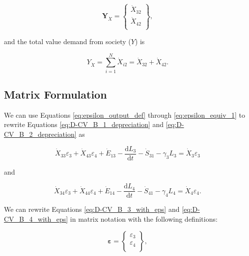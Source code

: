 \documentclass[authoryear,preprint,review,12pt]{elsarticle}
\renewcommand{\vec}[1]{\mathbf{#1}}
\begin{document}
\begin{equation} \label{eq:D-demand_vector_B_dot}
	\vec{Y}_{\dot{X}} = 	\begin{Bmatrix} 	\dot{X}_{32}	\\
																\dot{X}_{42}	\\
									\end{Bmatrix},
\end{equation}

\noindent and the total value demand from society ($Y$) is 

\begin{equation} \label{eq:D-total_value_demand}
	Y_{\dot{X}} = \sum_{i=1}^{N} \dot{X}_{i2} = \dot{X}_{32} + \dot{X}_{42}.
	\end{equation}

\subsection{Matrix Formulation}

We can use Equations \ref{eq:epsilon_output_def} through \ref{eq:epsilon_equiv_1} to rewrite Equations \ref{eq:D-CV_B_1_depreciation} and \ref{eq:D-CV_B_2_depreciation} as

\begin{equation} \label{eq:D-CV_B_3_with_eps}
	\dot{X}_{33}\varepsilon_{3} + \dot{X}_{43}\varepsilon_{4} + \dot{E}_{13} - \frac{\mathrm{d}L_{3}}{\mathrm{d}t} - \dot{S}_{31} - \gamma_{3}L_{3} = \dot{X}_{3}\varepsilon_{3}
\end{equation}

\noindent and 

\begin{equation} \label{eq:D-CV_B_4_with_eps}
	\dot{X}_{34}\varepsilon_{3} + \dot{X}_{44}\varepsilon_{4} + \dot{E}_{14} - \frac{\mathrm{d}L_{4}}{\mathrm{d}t} - \dot{S}_{41} - \gamma_{4}L_{4} = \dot{X}_{4}\varepsilon_{4}.
\end{equation}

We can rewrite Equations \ref{eq:D-CV_B_3_with_eps} and \ref{eq:D-CV_B_4_with_eps} in matrix notation with the following definitions:

\begin{equation} \label{eq:D-eps_vec_def}
	\vec{\varepsilon} =		\begin{Bmatrix} 	\varepsilon_{3}	\\
																\varepsilon_{4}	\\
									\end{Bmatrix},
\end{equation}
\end{document}
